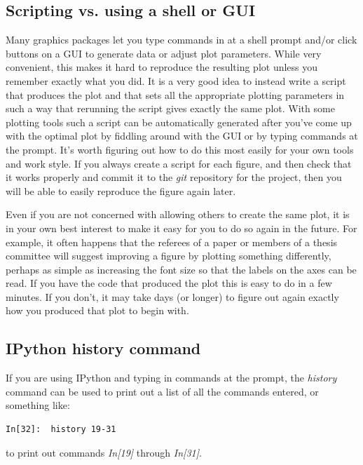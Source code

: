 \documentclass[letterpaper,10pt,english]{sphinxmanual}
\begin{document}
\subsection{Scripting vs. using a shell or GUI}
\label{reproducibility:scripting-vs-using-a-shell-or-gui}
Many graphics packages let you type commands in at a shell prompt and/or
click buttons on a GUI to generate data or adjust plot parameters.  While
very convenient, this makes it hard to reproduce the resulting plot unless
you remember exactly what you did.
It is a very good idea to instead write a script that produces the plot and
that sets all the appropriate plotting parameters in such a way that
rerunning the script gives exactly the same plot.  With some plotting tools
such a script can be automatically generated after you've come up with the
optimal plot by fiddling around with the GUI or by typing commands at the
prompt.  It's worth figuring out how to do this most easily for your own
tools and work style.  If you always create a script for each figure, and
then check that it works properly and commit it to the \emph{git} repository
for the project, then you will be able to easily reproduce the figure again
later.

Even if you are not concerned with allowing others to create the same plot,
it is in your own best interest to make it easy for you to do so again in
the future.  For example, it often happens that the referees of a paper or
members of a thesis committee will suggest improving a figure by plotting
something differently, perhaps as simple as increasing the font size so that
the labels on the axes can be read.  If you have the code that produced the
plot this is easy to do in a few minutes.  If you don't, it may take days
(or longer) to figure out again exactly how you produced that plot to begin
with.


\subsection{IPython history command}
\label{reproducibility:ipython-history-command}
If you are using IPython and typing in commands at the prompt,
the \emph{history} command can be used to print out a list of all the commands
entered, or something like:

\begin{Verbatim}[commandchars=\\\{\}]
In[32]:  history 19-31
\end{Verbatim}

to print out commands \emph{In{[}19{]}} through \emph{In{[}31{]}}.
\end{document}
